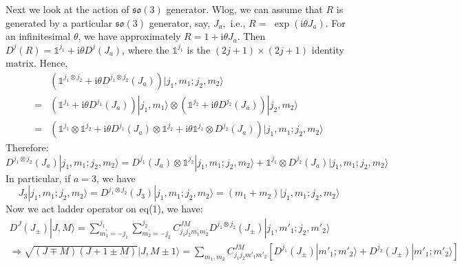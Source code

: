\documentclass{article}
\begin{document}
	Next we look at the action of $\mathfrak{so}( 3)$ generator. Wlog, we can assume that $R$ is generated by a particular $\mathfrak{so} (3)$ generator, say, $J_{a} ,$ i.e., $R=$ $\exp(\mathrm{i} \theta J_{a})$. For an infinitesimal $\theta $, we have approximately $R=1+\mathrm{i} \theta J_{a}$. Then $D^{j} (R)=\mathds{1}^{j_{1}} +\mathrm{i} \theta D^{j}( J_{a})$, where the $\mathds{1}^{j_{1}}$ is the $(2j+1)\times (2j+1)$ identity matrix. Hence,
	\begin{equation*}
		\begin{aligned}
			& \left(\mathds{1}^{j_{1} \otimes j_{2}} +\mathrm{i} \theta D^{j_{1} \otimes j_{2}}( J_{a})\right)| j_{1} ,m_{1} ;j_{2} ,m_{2}\rangle \\
			= & \left(\mathds{1}^{j_{1}} +\mathrm{i} \theta D^{j_{1}}( J_{a})\right)| j_{1} ,m_{1}\rangle  \otimes \left(\mathds{1}^{j_{2}} +\mathrm{i} \theta D^{j_{2}}( J_{a})\right)| j_{2} ,m_{2}\rangle  \\
			= & \left(\mathds{1}^{j_{1}} \otimes \mathds{1}^{j_{2}} +\mathrm{i} \theta D^{j_{1}}( J_{a}) \otimes \mathds{1}^{j_{2}} +\mathrm{i} \theta \mathds{1}^{j_{1}} \otimes D^{j_{2}}( J_{a})\right)| j_{1} ,m_{1} ;j_{2} ,m_{2}\rangle 
		\end{aligned}
	\end{equation*}
	Therefore:
	\begin{equation}
		D^{j_{1} \otimes j_{2}}( J_{a})| j_{1} ,m_{1} ;j_{2} ,m_{2}\rangle =D^{j_{1}}( J_{a}) \otimes \mathds{1}^{j_{2}}| j_{1} ,m_{1} ;j_{2} ,m_{2}\rangle +\mathds{1}^{j_{1}} \otimes D^{j_{2}}( J_{a})| j_{1} ,m_{1} ;j_{2} ,m_{2}\rangle 
	\end{equation}
	In particular, if $a=3$, we have
	\begin{equation*}
		J_{3}| j_{1} ,m_{1} ;j_{2} ,m_{2}\rangle =D^{j_{1} \otimes j_{2}}( J_{3})| j_{1} ,m_{1} ;j_{2} ,m_{2}\rangle =( m_{1} +m_{2})| j_{1} ,m_{1} ;j_{2} ,m_{2}\rangle 
	\end{equation*}
	Now we act ladder operator on eq(1), we have:
	\begin{equation*}
		\begin{array}{ c }
			D^{J}( J_{\pm }) |J,M\rangle  ={\displaystyle \sum\limits _{m_{1}^{\prime } =-j_{1}}^{j_{1}}\sum\limits _{m_{2}^{\prime } =-j_{2}}^{j_{2}}} C_{j_{1} j_{2} m_{1}^{\prime } m_{2}^{\prime }}^{JM} D^{j_{1} \otimes j_{2}}( J_{\pm })| j_{1} ,m'_{1} ;j_{2} ,m'_{2}\rangle  \\
			\Longrightarrow \sqrt{(J\mp M)(J+1\pm M)} |J,M\pm 1\rangle  ={\displaystyle \sum\limits _{m_{1} ,m_{2}}} C_{j_{1} j_{2} m'_{1} m'_{2}}^{JM}\left[ D^{j_{1}}( J_{\pm })| m'_{1} ;m'_{2}\rangle  +D^{j_{2}}( J_{\pm })| m'_{1} ;m'_{2}\rangle  \right]
		\end{array}
	\end{equation*}
\end{document}

